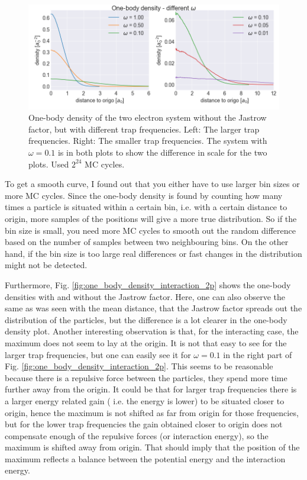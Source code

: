 \begin{figure}[H]
\center
\includegraphics[width=0.85\linewidth]{../Results/one_body_density_no_interaction_2p}\caption{One-body density of the two electron system without the Jastrow factor, but with different trap frequencies. Left: The larger trap frequencies. Right: The smaller trap frequencies. The system with $\omega = 0.1$ is in both plots to show the difference in scale for the two plots. Used $2^{24}$ MC cycles. }\label{fig:one_body_density_no_interaction_2p}
\end{figure}

To get a smooth curve, I found out that you either have to use larger bin sizes or more MC cycles. Since the one-body density is found by counting how many times a particle is situated within a certain bin, i.e. with a certain distance to origin, more samples of the positions will give a more true distribution. So if the bin size is small, you need more MC cycles to smooth out the random difference based on the number of samples between two neighbouring bins. On the other hand, if the bin size is too large real differences or fast changes in the distribution might not be detected.

Furthermore, Fig. \ref{fig:one_body_density_interaction_2p} shows the one-body densities with and without the Jastrow factor. Here, one can also observe the same as was seen with the mean distance, that the Jastrow factor spreads out the distribution of the particles, but the difference is a lot clearer in the one-body density plot. Another interesting observation is that, for the interacting case, the maximum does not seem to lay at the origin. It is not that easy to see for the larger trap frequencies, but one can easily see it for $\omega = 0.1$ in the right part of Fig. \ref{fig:one_body_density_interaction_2p}. This seems to be reasonable because there is a repulsive force between the particles, they spend more time further away from the origin. It could be that for larger trap frequencies there is a larger energy related gain ( i.e. the energy is lower) to be situated closer to origin, hence the maximum is not shifted as far from origin for those frequencies, but for the lower trap frequencies the gain obtained closer to origin does not compensate enough of the repulsive forces (or interaction energy), so the maximum is shifted away from origin. That should imply that the position of the maximum reflects a balance between the potential energy and the interaction energy. 

